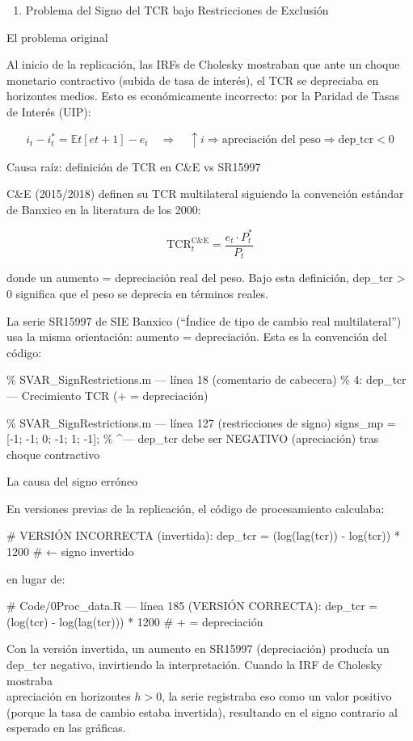 \documentclass[
]{article}
\providecommand{\tightlist}{%
  \setlength{\itemsep}{0pt}\setlength{\parskip}{0pt}}
\begin{document}
\begin{enumerate}
\def\labelenumi{\Roman{enumi}.}
\setcounter{enumi}{3}
\tightlist
\item
  Problema del Signo del TCR bajo Restricciones de Exclusión
\end{enumerate}

El problema original

Al inicio de la replicación, las IRFs de Cholesky mostraban que ante un
choque monetario contractivo (subida de tasa de interés), el TCR se
depreciaba en horizontes medios. Esto es económicamente incorrecto: por
la Paridad de Tasas de Interés (UIP):

\[i_t - i_t^* = \mathbb{E}t[e{t+1}] - e_t \quad \Rightarrow \quad \uparrow i \Rightarrow \text{apreciación del peso} \Rightarrow \text{dep_tcr} < 0\]

Causa raíz: definición de TCR en C\&E vs SR15997

C\&E (2015/2018) definen su TCR multilateral siguiendo la convención
estándar de Banxico en la literatura de los 2000:

\[\text{TCR}_{t}^{\text{C&E}} = \frac{e_t \cdot P_t^*}{P_t}\]

donde un aumento = depreciación real del peso. Bajo esta definición,
dep\_tcr \textgreater{} 0 significa que el peso se deprecia en términos
reales.

La serie SR15997 de SIE Banxico (``Índice de tipo de cambio real
multilateral'') usa la misma orientación: aumento = depreciación. Esta
es la convención del código:

\% SVAR\_SignRestrictions.m --- línea 18 (comentario de cabecera) \% 4:
dep\_tcr --- Crecimiento TCR (+ = depreciación)

\% SVAR\_SignRestrictions.m --- línea 127 (restricciones de signo)
signs\_mp = {[}-1; -1; 0; -1; 1; -1{]}; \% \^{}--- dep\_tcr debe ser
NEGATIVO (apreciación) tras choque contractivo

La causa del signo erróneo

En versiones previas de la replicación, el código de procesamiento
calculaba:

\# VERSIÓN INCORRECTA (invertida): dep\_tcr = (log(lag(tcr)) - log(tcr))
* 1200 \# ← signo invertido

en lugar de:

\# Code/0Proc\_data.R --- línea 185 (VERSIÓN CORRECTA): dep\_tcr =
(log(tcr) - log(lag(tcr))) * 1200 \# + = depreciación

Con la versión invertida, un aumento en SR15997 (depreciación) producía
un dep\_tcr negativo, invirtiendo la interpretación. Cuando la IRF de
Cholesky mostraba\\
apreciación en horizontes \(h > 0\), la serie registraba eso como un
valor positivo (porque la tasa de cambio estaba invertida), resultando
en el signo contrario al esperado en las gráficas.
\end{document}
